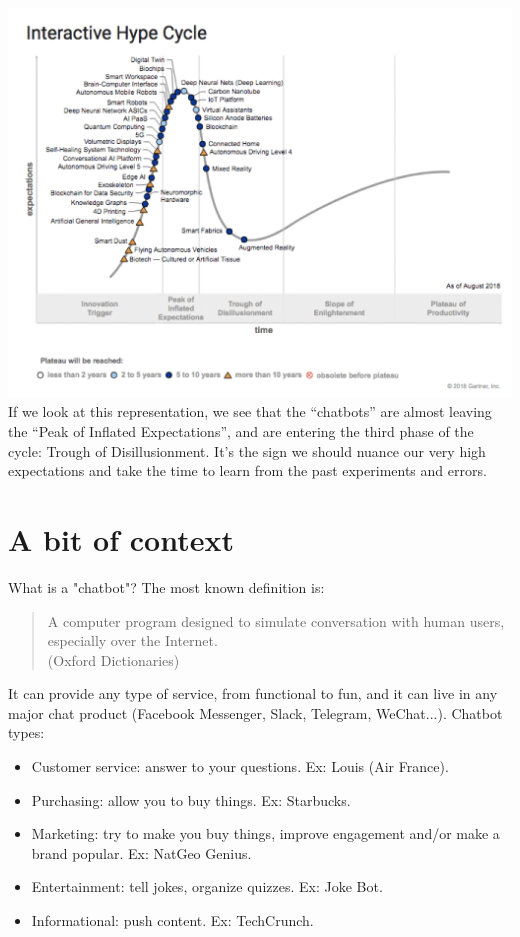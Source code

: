 \documentclass{article}
\begin{document}
\includegraphics[scale=0.6]{images/hype_cycle.png}
\break
If we look at this representation, we see that the “chatbots” are almost leaving the “Peak of Inflated Expectations”, and are entering the third phase of the cycle: Trough of Disillusionment. It’s the sign we should nuance our very high expectations and take the time to learn from the past experiments and errors.

\section{A bit of context}
What is a "chatbot"? The most known definition is: 
\begin{quote}
A computer program designed to simulate conversation with human users, especially over the Internet. \\
(Oxford Dictionaries)
\end{quote}
It can provide any type of service, from functional to fun, and it can live in any major chat product (Facebook Messenger, Slack, Telegram, WeChat...). 
\break
Chatbot types:
\begin{itemize}  
    \item Customer service: answer to your questions. Ex: Louis (Air France).
    \item Purchasing: allow you to buy things. Ex: Starbucks.
    \item Marketing: try to make you buy things, improve engagement and/or make a brand popular. Ex: NatGeo Genius.
    \item Entertainment: tell jokes, organize quizzes. Ex: Joke Bot.
    \item Informational: push content. Ex: TechCrunch.
\end{itemize}
\end{document}
